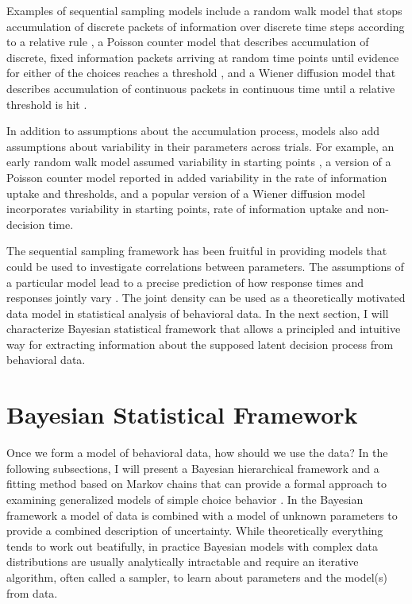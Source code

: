 \documentclass[12pt]{report}
\begin{document}
Examples of sequential sampling models include a random walk model that
stops accumulation of discrete packets of information over
discrete time steps according to a relative rule \citep{Lam1968}, a Poisson
counter model that describes accumulation of discrete, fixed information
packets arriving at random time points until evidence for either of the choices reaches a threshold
\citep{TowAsh1983}, and a Wiener diffusion model that describes accumulation
of continuous packets in continuous time until a relative threshold is hit
\citep{Rat1978}. 

In addition to assumptions about the accumulation process, models also add assumptions about variability in their parameters across trials. For example, an early random walk model assumed variability in starting points \citep{Lam1968}, a version of a Poisson counter model reported in \citet{RatSmi2004} added variability in the rate of information uptake and thresholds, and a popular version of a Wiener diffusion  model incorporates variability in starting points, rate of information uptake and non-decision time.

The sequential sampling framework has been fruitful in providing models that could be used to investigate correlations between parameters. The assumptions of a particular model lead to a precise prediction of how response times and responses jointly vary \citep{RatSmi2004}. The joint density can be used as a theoretically motivated data model in statistical analysis of behavioral data. In the next section, I will characterize Bayesian statistical framework that allows a principled and intuitive way for extracting information about the supposed latent decision process from behavioral data.

\section{Bayesian Statistical Framework}

Once we form a model of behavioral data, how should we use the data? In the following subsections, I will present a Bayesian hierarchical framework and a fitting method based on Markov chains that can provide a formal approach to examining generalized models of simple choice behavior \citep{Ber1997,CasBer2002,GelCar2013}. In the Bayesian framework a model of data is combined with a model of unknown parameters to provide a combined description of uncertainty. While theoretically everything tends to work out beatifully, in practice Bayesian models with complex data distributions are usually analytically intractable and require an iterative algorithm, often called a sampler, to learn about parameters and the model(s) from data. 
\end{document}

